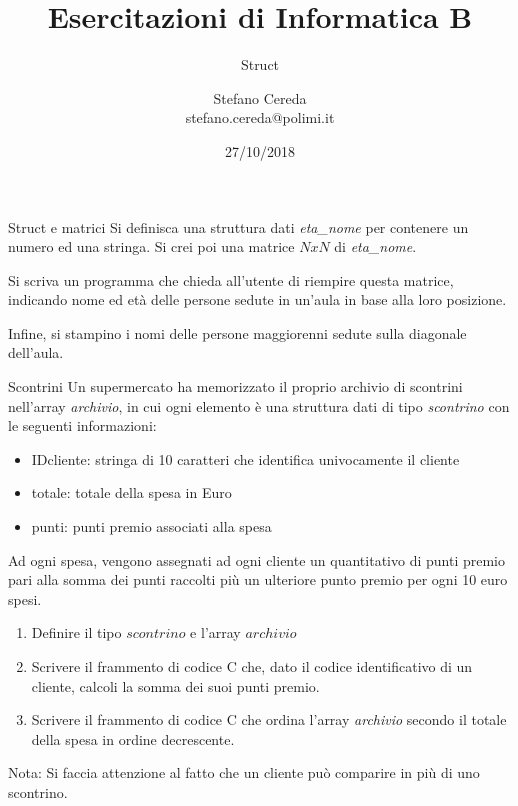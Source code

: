 \documentclass[aspectratio=169, handout]{beamer}
\title{Esercitazioni di Informatica B}
\subtitle{Struct}
\author{Stefano Cereda\\
	stefano.cereda@polimi.it
}
\date{27/10/2018}
\institute[PoliMi]{Politecnico Milano}
\begin{document}
	\begin{frame}
	\maketitle
\end{frame}


\begin{frame}{Struct e matrici}
    Si definisca una struttura dati \emph{eta\_nome} per contenere un numero ed una stringa.
    Si crei poi una matrice $N x N$ di \emph{eta\_nome}.

    Si scriva un programma che chieda all'utente di riempire questa matrice, indicando nome ed età delle persone sedute
    in un'aula in base alla loro posizione.

    Infine, si stampino i nomi delle persone maggiorenni sedute sulla diagonale dell'aula.
\end{frame}

\begin{frame}[allowframebreaks]{Scontrini}
Un supermercato ha memorizzato il proprio archivio di scontrini nell'array \emph{archivio}, in cui ogni elemento è una struttura dati di tipo \emph{scontrino} con le  seguenti informazioni:
\begin{itemize}
	\item IDcliente: stringa di 10 caratteri che identifica univocamente il cliente
	\item totale: totale della spesa in Euro
	\item punti: punti premio associati alla spesa
\end{itemize}
Ad ogni spesa, vengono assegnati ad ogni cliente un quantitativo di punti premio pari alla somma dei punti raccolti più un ulteriore punto premio per ogni 10 euro spesi.

\begin{enumerate}
	\item  Definire il tipo $scontrino$ e l'array $archivio$
	\item Scrivere il frammento di codice C che, dato il codice identificativo di un cliente, calcoli la somma dei suoi punti premio.
	\item Scrivere il frammento di codice C che ordina l'array \emph{archivio} secondo il totale della spesa in ordine decrescente.
\end{enumerate}
Nota: Si faccia attenzione al fatto che un cliente può comparire in più di uno scontrino.
\end{frame}
\end{document}
